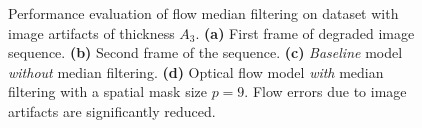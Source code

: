\begin{figure}[!ht]
  \centerline{
    \mbox{}
    \mbox{}    
  }
  \vspace{3pt}
  \centerline{
    \mbox{}
    \mbox{}
  }
  \caption[Modeling contrast]{Performance evaluation of flow median filtering on \rub dataset with image artifacts of thickness $A_3$. \textbf{(a)} First frame of degraded image sequence. \textbf{(b)} Second frame of the sequence. \textbf{(c)} \textit{Baseline} model \textit{without} median filtering. \textbf{(d)} Optical flow model \textit{with} median filtering with a spatial mask size $p=9$.  Flow errors due to image artifacts are significantly reduced. }
  \label{fig:exp_median_filtering}
\end{figure}  


